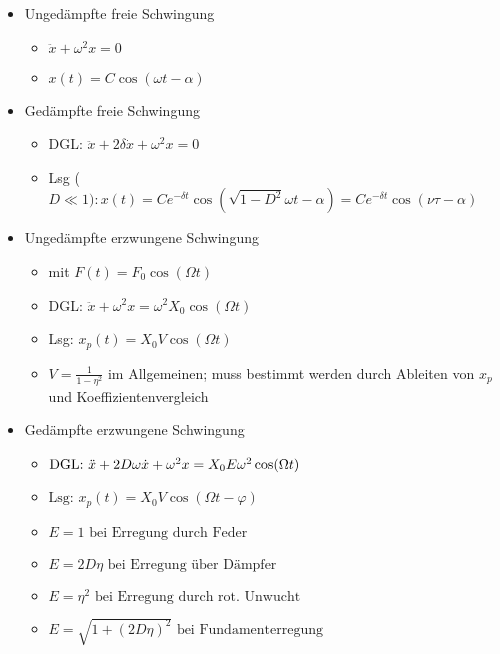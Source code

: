 \documentclass[fleqn,twoside]{article}
\begin{document}
\begin{multicols*}{3}
\begin{itemize}
    \item Ungedämpfte freie Schwingung
    \begin{itemize}
    \item {} $\ddot{x}+\omega^2 x=0 $
    \item {} $x(t)=C \cos (\omega t-\alpha)$
    \end{itemize}
    \item Gedämpfte freie Schwingung
    \begin{itemize}
    \item DGL: $\ddot{x}+2 \delta \dot{x}+\omega^2 x=0$
    \small
    \item Lsg ($D \ll 1): x(t)=C e^{-\delta t} \cos \left(\sqrt{1-D^2} \omega t-\alpha\right)=C e^{-\delta t} \cos (\nu \tau-\alpha)$
    \small
    \end{itemize}
    \item Ungedämpfte erzwungene Schwingung
    \begin{itemize}
    \item mit $F(t)=F_0 \cos (\Omega t)$
    \item DGL: $\ddot{x}+\omega^2 x=\omega^2 X_0 \cos (\Omega t)$
    \item Lsg: $x_p(t)=X_0 V \cos (\Omega t)$
    \item $V=\frac{1}{1-\eta^2}$ im Allgemeinen; muss bestimmt werden durch Ableiten von $x_p$ und Koeffizientenvergleich
    \end{itemize}




\item Gedämpfte erzwungene Schwingung
\begin{itemize}
\item $\text {DGL: } \Ddot{x}+2 D \omega \dot{x}+\omega^2 x=X_0 E \omega^2 \cos (\Omega t) $
\item $\text {Lsg: } x_p(t)=X_0 V \cos (\Omega t-\varphi) $
\item $E=1 \text { bei Erregung durch Feder } $
\item $E=2 D \eta \text { bei Erregung über Dämpfer } $
\item $E=\eta^2 \text { bei Erregung durch rot. Unwucht } $
\item $E=\sqrt{1+(2 D \eta)^2} \text { bei Fundamenterregung }$
\end{itemize}
\end{itemize}



\end{multicols*}
\end{document}
